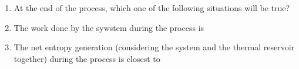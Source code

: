 \documentclass[journal,12pt,onecolumn]{IEEEtran}
\begin{document}
\begin{enumerate}
    \item At the end of the process, which one of the following situations will be true?\\

          \begin{enumerate}
          \end{enumerate}

    \item The work done by the sywstem during the process is\\

          \begin{enumerate}
          \end{enumerate}

    \item The net entropy generation (considering the system and the thermal reservoir together) during the process is closest to\\

          \begin{enumerate}
          \end{enumerate}


\end{enumerate}
\end{document}
